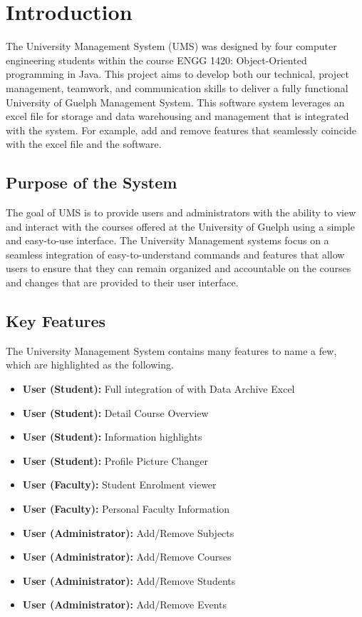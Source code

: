 \newpage
\section{Introduction}

The University Management System (UMS) was designed by four computer engineering students within the course ENGG 1420: Object-Oriented programming in Java. This project aims to develop both our technical, project management, teamwork, and communication skills to deliver a fully functional University of Guelph Management System. This software system leverages an excel file for storage and data warehousing and management that is integrated with the system. For example, add and remove features that seamlessly coincide with the excel file and the software.



\subsection{Purpose of the System}

The goal of UMS is to provide users and administrators with the ability to view and interact with the courses offered at the University of Guelph using a simple and easy-to-use interface. The University Management systems focus on a seamless integration of easy-to-understand commands and features that allow users to ensure that they can remain organized and accountable on the courses and changes that are provided to their user interface.

\subsection{Key Features}

The University Management System contains many features to name a few, which are highlighted as the following.
\begin{itemize}
    \item \textbf{User (Student):} Full integration of with Data Archive Excel
    \item \textbf{User (Student):} Detail Course Overview
    \item \textbf{User (Student):} Information highlights
    \item \textbf{User (Student):} Profile Picture Changer
    \item \textbf{User (Faculty):} Student Enrolment viewer
    \item \textbf{User (Faculty):} Personal Faculty Information
    \item \textbf{User (Administrator):} Add/Remove Subjects
    \item \textbf{User (Administrator):} Add/Remove Courses
    \item \textbf{User (Administrator):} Add/Remove Students
    \item \textbf{User (Administrator):} Add/Remove Events
    
\end{itemize}

